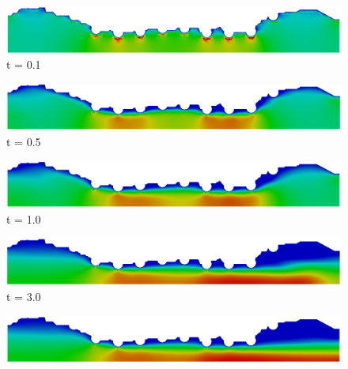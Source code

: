 \vspace{2cm} 
\begin{figure}[H]
     \begin{minipage}{.50\linewidth}
      \centering
      \includegraphics[scale=0.18]{./02_chaps/cap_solution/figure/vel_RealStrut1.png}\\
      t = 0.1
     \end{minipage}%
     \begin{minipage}{.50\linewidth}
      \centering
      \includegraphics[scale=0.18]{./02_chaps/cap_solution/figure/vel_RealStrut2.png}\\
      t = 0.5
     \end{minipage}
     \begin{minipage}{.50\linewidth}
     \medskip
      \centering
      \includegraphics[scale=0.18]{./02_chaps/cap_solution/figure/vel_RealStrut3.png}\\
      t = 1.0
     \end{minipage}%
     \begin{minipage}{.50\linewidth}
     \medskip
      \centering
      \includegraphics[scale=0.18]{./02_chaps/cap_solution/figure/vel_RealStrut4.png}\\
      t = 3.0
     \end{minipage}
     \begin{minipage}{.50\linewidth}
      \centering
      \includegraphics[scale=0.18]{./02_chaps/cap_solution/figure/vel_RealStrut5.png}\\

\end{minipage}
\end{figure}

